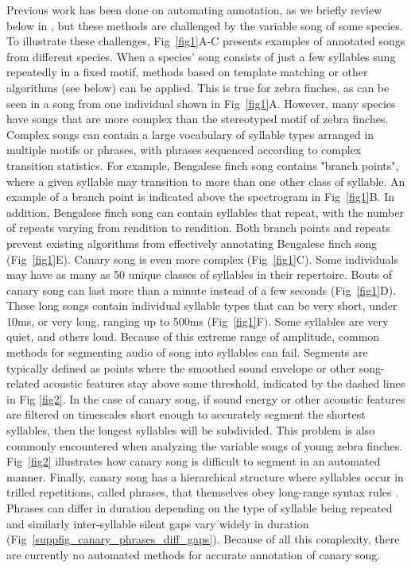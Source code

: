 \documentclass[10pt,letterpaper]{article}
\begin{document}
Previous work has been done on automating annotation, 
as we briefly review below in ,
but these methods are challenged by the variable song of some species.
To illustrate these challenges,  Fig~\ref{fig1}A-C presents examples of annotated songs from different species.
When a species' song consists of just a few syllables sung repeatedly in a fixed motif, methods based on template matching or 
other algorithms (see  below) can be applied.
This is true for zebra finches, as can be seen in a song from one individual shown in Fig~\ref{fig1}A.
However, many species have songs that are more complex than the stereotyped motif of zebra finches.
Complex songs can contain a large vocabulary of syllable types arranged in multiple motifs or phrases, 
with phrases sequenced according to complex transition statistics. For example, Bengalese
finch song contains "branch points", where a given syllable may transition to more than one other class of
syllable. An example of a branch point is indicated above the spectrogram in Fig~\ref{fig1}B. In addition,
Bengalese finch song can contain syllables that repeat, with the number of repeats varying from rendition to
rendition. Both branch points and repeats prevent existing algorithms from effectively annotating Bengalese
finch song (Fig~\ref{fig1}E). Canary song is even more complex (Fig~\ref{fig1}C). Some individuals may have as many as 50 unique classes of syllables in their repertoire. Bouts of canary song can last more than a minute instead of a few seconds (Fig~\ref{fig1}D). These long songs contain individual syllable types that  can be very short, under 10ms, or very long, ranging up to 500ms (Fig~\ref{fig1}F). Some syllables are very quiet, and others loud.
Because of this extreme range of amplitude, common methods for segmenting audio of song into syllables can fail.
Segments are typically defined as points where the smoothed sound envelope or other song-related acoustic features \cite{tchernichovski_procedure_2000} stay above some threshold, indicated by the dashed lines in Fig \ref{fig2}. In the case of canary song, if sound energy or other acoustic features are filtered on timescales short enough to accurately segment the shortest syllables, then the longest syllables will be subdivided. This problem is also commonly encountered when analyzing the variable songs of young zebra finches. 
Fig~\ref{fig2} illustrates how canary song is difficult to segment in an automated manner. 
Finally, canary song has a hierarchical structure where syllables occur in trilled repetitions, called phrases, that themselves obey long-range syntax rules \cite{markowitz_long-range_2013,gardner_freedom_2005}. Phrases can differ in duration depending on the type of syllable being repeated and similarly inter-syllable silent gaps vary widely in duration (Fig~\ref{suppfig_canary_phrases_diff_gaps}). Because of all this complexity, there are currently no automated methods for accurate annotation of canary song.
\end{document}
